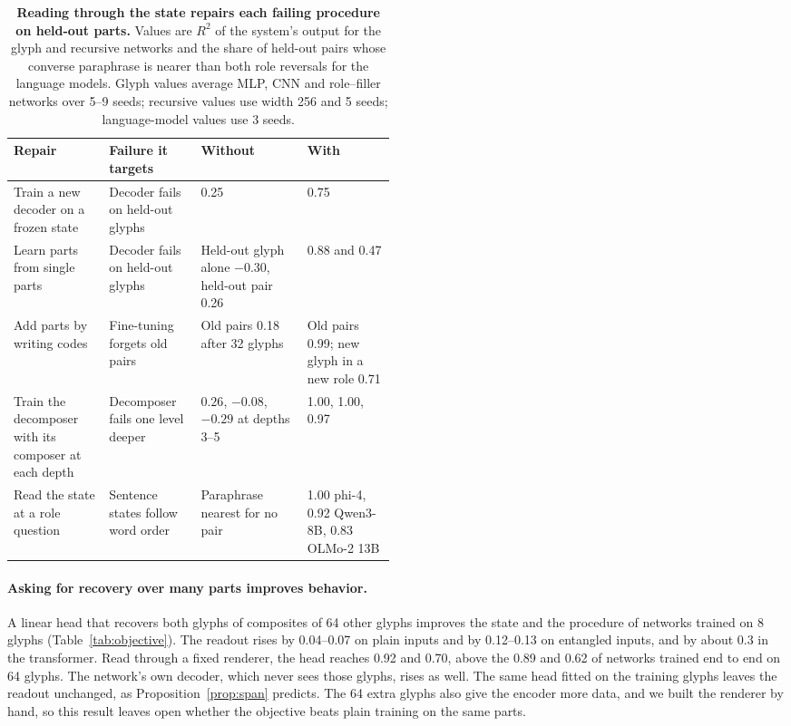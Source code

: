 \begin{table}[t]
  \caption{\textbf{Reading through the state repairs each failing procedure on held-out parts.} Values are $R^2$ of the system's output for the glyph and recursive networks and the share of held-out pairs whose converse paraphrase is nearer than both role reversals for the language models. Glyph values average MLP, CNN and role--filler networks over 5--9 seeds; recursive values use width 256 and 5 seeds; language-model values use 3 seeds.}
  \label{tab:remedies}
  \centering\small
  \begin{tabularx}{\linewidth}{@{}P{0.25\linewidth}P{0.24\linewidth}YY@{}}
    \toprule
    Repair & Failure it targets & Without & With \\
    \midrule
    Train a new decoder on a frozen state & Decoder fails on held-out glyphs & 0.25 & 0.75 \\
    Learn parts from single parts & Decoder fails on held-out glyphs & Held-out glyph alone $-0.30$, held-out pair 0.26 & 0.88 and 0.47 \\
    Add parts by writing codes & Fine-tuning forgets old pairs & Old pairs 0.18 after 32 glyphs & Old pairs 0.99; new glyph in a new role 0.71 \\
    Train the decomposer with its composer at each depth & Decomposer fails one level deeper & $0.26$, $-0.08$, $-0.29$ at depths 3--5 & 1.00, 1.00, 0.97 \\
    Read the state at a role question & Sentence states follow word order & Paraphrase nearest for no pair & 1.00 phi-4, 0.92 Qwen3-8B, 0.83 OLMo-2 13B \\
    \bottomrule
  \end{tabularx}
\end{table}

\paragraph{Asking for recovery over many parts improves behavior.} A linear head that recovers both glyphs of composites of 64 other glyphs improves the state and the procedure of networks trained on 8 glyphs (Table~\ref{tab:objective}). The readout rises by 0.04--0.07 on plain inputs and by 0.12--0.13 on entangled inputs, and by about 0.3 in the transformer. Read through a fixed renderer, the head reaches 0.92 and 0.70, above the 0.89 and 0.62 of networks trained end to end on 64 glyphs. The network's own decoder, which never sees those glyphs, rises as well. The same head fitted on the training glyphs leaves the readout unchanged, as Proposition~\ref{prop:span} predicts. The 64 extra glyphs also give the encoder more data, and we built the renderer by hand, so this result leaves open whether the objective beats plain training on the same parts.

